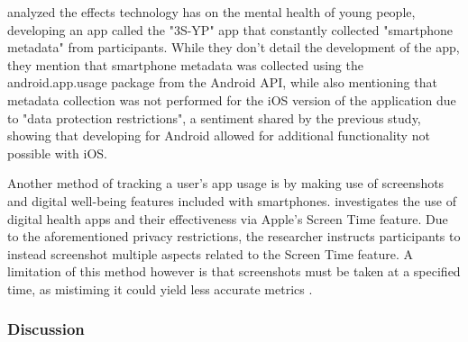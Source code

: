 \documentclass[12pt]{article}
\begin{document}
\textcite{RefWorks:RefID:116-bye2024cohort} analyzed the effects technology has on 
the mental health of young people, developing an app called the "3S-YP" app 
that constantly collected "smartphone metadata" from participants. 
While they don't detail the development of the app, they mention that smartphone metadata was collected using 
the android.app.usage package from the Android API, while also mentioning that metadata collection was not 
performed for the iOS version of the application due to "data protection restrictions", a sentiment shared by the 
previous study, showing that developing for Android allowed for additional functionality not possible with iOS.\newline

Another method of tracking a user's app usage is by making use of screenshots
and digital well-being features included with smartphones. \textcite{RefWorks:RefID:124-ubochi2019apples} 
investigates the use of digital health apps and their effectiveness via Apple's Screen Time feature. 
Due to the aforementioned privacy restrictions, the researcher instructs participants to instead 
screenshot multiple aspects related to the Screen Time feature. A limitation of this method however is that 
screenshots must be taken at a specified time, as mistiming it could yield less accurate 
metrics \autocite{RefWorks:RefID:123-2024mobile}.



\subsubsection{Discussion}
\end{document}
